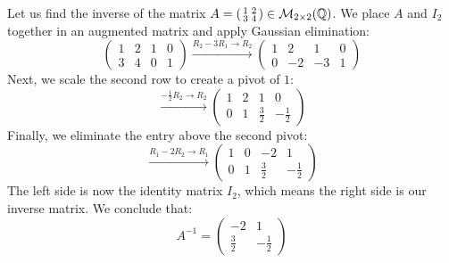 \begin{example}
Let us find the inverse of the matrix $A = \left(\begin{smallmatrix} 1 & 2 \\ 3 & 4 \end{smallmatrix}\right) \in \mathcal{M}_{2 \times 2}(\mathbb{Q})$. We place $A$ and $I_2$ together in an augmented matrix and apply Gaussian elimination:
\begin{equation*}
    \left( \begin{array}{cc|cc} 1 & 2 & 1 & 0 \\ 3 & 4 & 0 & 1 \end{array} \right) \xrightarrow{R_2 - 3R_1 \longrightarrow R_2} \left( \begin{array}{cc|cc} 1 & 2 & 1 & 0 \\ 0 & -2 & -3 & 1 \end{array} \right)
\end{equation*}
Next, we scale the second row to create a pivot of $1$:
\begin{equation*}
    \xrightarrow{-\frac{1}{2}R_2 \longrightarrow R_2} \left( \begin{array}{cc|cc} 1 & 2 & 1 & 0 \\ 0 & 1 & \frac{3}{2} & -\frac{1}{2} \end{array} \right)
\end{equation*}
Finally, we eliminate the entry above the second pivot:
\begin{equation*}
    \xrightarrow{R_1 - 2R_2 \longrightarrow R_1} \left( \begin{array}{cc|cc} 1 & 0 & -2 & 1 \\ 0 & 1 & \frac{3}{2} & -\frac{1}{2} \end{array} \right)
\end{equation*}
The left side is now the identity matrix $I_2$, which means the right side is our inverse matrix. We conclude that:
\begin{equation*}
    A^{-1} = \begin{pmatrix} -2 & 1 \\ \frac{3}{2} & -\frac{1}{2} \end{pmatrix}
\end{equation*}
\end{example}

